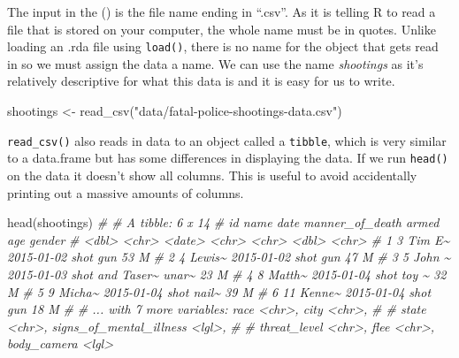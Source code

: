 \documentclass[
  a4paper,
]{krantz}
\makeatletter
\newenvironment{Shaded}{\begin{snugshade}}{\end{snugshade}}
\newcommand{\CommentTok}[1]{\textcolor[rgb]{0.37,0.37,0.37}{\textit{#1}}}
\newcommand{\FunctionTok}[1]{\textcolor[rgb]{0,0,0}{#1}}
\newcommand{\NormalTok}[1]{#1}
\newcommand{\OtherTok}[1]{\textcolor[rgb]{0.37,0.37,0.37}{#1}}
\newcommand{\StringTok}[1]{\textcolor[rgb]{0.5,0.5,0.5}{#1}}
\newenvironment{kframe}{%
\medskip{}
\setlength{\fboxsep}{.8em}
 \def\at@end@of@kframe{}%
 \ifinner\ifhmode%
  \def\at@end@of@kframe{\end{minipage}}%
  \begin{minipage}{\columnwidth}%
 \fi\fi%
 \def\FrameCommand##1{\hskip\@totalleftmargin \hskip-\fboxsep
 \colorbox{shadecolor}{##1}\hskip-\fboxsep
     \hskip-\linewidth \hskip-\@totalleftmargin \hskip\columnwidth}%
 \MakeFramed {\advance\hsize-\width
   \@totalleftmargin\z@ \linewidth\hsize
   \@setminipage}}%
 {\par\unskip\endMakeFramed%
 \at@end@of@kframe}
\renewenvironment{Shaded}{\begin{kframe}}{\end{kframe}}
\makeatother
\begin{document}
The input in the () is the file name ending in ``.csv''. As
it is telling R to read a file that is stored on your
computer, the whole name must be in quotes. Unlike loading
an .rda file using \texttt{load()}, there is no name for the
object that gets read in so we must assign the data a name.
We can use the name \emph{shootings} as it's relatively
descriptive for what this data is and it is easy for us to
write.

\begin{Shaded}
\begin{Highlighting}[]
\NormalTok{shootings }\OtherTok{\textless{}{-}} \FunctionTok{read\_csv}\NormalTok{(}\StringTok{"data/fatal{-}police{-}shootings{-}data.csv"}\NormalTok{)}
\end{Highlighting}
\end{Shaded}

\texttt{read\_csv()} also reads in data to an object called
a \texttt{tibble}, which is very similar to a data.frame but
has some differences in displaying the data. If we run
\texttt{head()} on the data it doesn't show all columns.
This is useful to avoid accidentally printing out a massive
amounts of columns.

\begin{Shaded}
\begin{Highlighting}[]
\FunctionTok{head}\NormalTok{(shootings)}
\CommentTok{\# \# A tibble: 6 x 14}
\CommentTok{\#      id name   date       manner\_of\_death armed   age gender}
\CommentTok{\#   \textless{}dbl\textgreater{} \textless{}chr\textgreater{}  \textless{}date\textgreater{}     \textless{}chr\textgreater{}           \textless{}chr\textgreater{} \textless{}dbl\textgreater{} \textless{}chr\textgreater{} }
\CommentTok{\# 1     3 Tim E\textasciitilde{} 2015{-}01{-}02 shot            gun      53 M     }
\CommentTok{\# 2     4 Lewis\textasciitilde{} 2015{-}01{-}02 shot            gun      47 M     }
\CommentTok{\# 3     5 John \textasciitilde{} 2015{-}01{-}03 shot and Taser\textasciitilde{} unar\textasciitilde{}    23 M     }
\CommentTok{\# 4     8 Matth\textasciitilde{} 2015{-}01{-}04 shot            toy \textasciitilde{}    32 M     }
\CommentTok{\# 5     9 Micha\textasciitilde{} 2015{-}01{-}04 shot            nail\textasciitilde{}    39 M     }
\CommentTok{\# 6    11 Kenne\textasciitilde{} 2015{-}01{-}04 shot            gun      18 M     }
\CommentTok{\# \# ... with 7 more variables: race \textless{}chr\textgreater{}, city \textless{}chr\textgreater{},}
\CommentTok{\# \#   state \textless{}chr\textgreater{}, signs\_of\_mental\_illness \textless{}lgl\textgreater{},}
\CommentTok{\# \#   threat\_level \textless{}chr\textgreater{}, flee \textless{}chr\textgreater{}, body\_camera \textless{}lgl\textgreater{}}
\end{Highlighting}
\end{Shaded}
\end{document}
